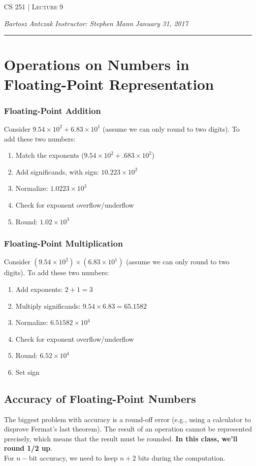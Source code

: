 \documentclass{report}
\newcommand{\lectureNum}{9}
\newcommand{\curDate}{January 31, 2017}
\newcommand{\course}{CS 251}
\newcommand{\instructor}{Stephen Mann}
\begin{document}
\begin{center}
\begin{Large}
\textsc{\course{} | Lecture \lectureNum{}}
\end{Large}
\end{center} 
\noindent \textit{Bartosz Antczak} \hfill
\textit{Instructor: \instructor{}} \hfill
\textit{\curDate{}}
\rule{\textwidth}{0.4pt}
\section{Operations on Numbers in Floating-Point Representation}
\subsubsection{Floating-Point Addition}
Consider $9.54 \times 10^2 + 6.83 \times 10^1$ (assume we can only round to two digits). To add these two numbers:
\begin{enumerate}
\item Match the exponents ($9.54 \times 10^2 + .683 \times 10^2$)
\item Add significands, with sign: $10.223 \times 10^2$
\item Normalize: $1.0223 \times 10^3$
\item Check for exponent overflow/underflow
\item Round: $1.02 \times 10^3$
\end{enumerate}
\subsubsection{Floating-Point Multiplication}
Consider $(9.54 \times 10^2) \times (6.83 \times 10^1)$ (assume we can only round to two digits). To add these two numbers:
\begin{enumerate}
\item Add exponents: $2 + 1 = 3$
\item Multiply significands: $9.54 \times 6.83 = 65.1582$
\item Normalize: $6.51582 \times 10^4$
\item Check for exponent overflow/underflow
\item Round: $6.52 \times 10^4$
\item Set sign
\end{enumerate}
\subsection{Accuracy of Floating-Point Numbers}
The biggest problem with accuracy is a round-off error (e.g., using a calculator to disprove Fermat's last theorem). The result of an operation cannot be represented precisely, which means that the result must be rounded. \textbf{In this class, we'll round 1/2 up}.\\
For $n-$bit accuracy, we need to keep $n+2$ bits during the computation.\newpage
\end{document}
